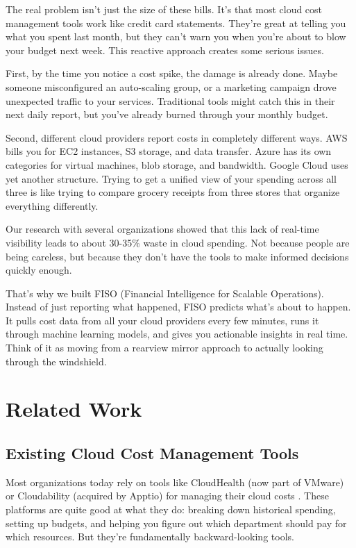 \documentclass[conference]{IEEEtran}
\begin{document}
The real problem isn't just the size of these bills. It's that most cloud cost management tools work like credit card statements. They're great at telling you what you spent last month, but they can't warn you when you're about to blow your budget next week. This reactive approach creates some serious issues.

First, by the time you notice a cost spike, the damage is already done. Maybe someone misconfigured an auto-scaling group, or a marketing campaign drove unexpected traffic to your services. Traditional tools might catch this in their next daily report, but you've already burned through your monthly budget.

Second, different cloud providers report costs in completely different ways. AWS bills you for EC2 instances, S3 storage, and data transfer. Azure has its own categories for virtual machines, blob storage, and bandwidth. Google Cloud uses yet another structure. Trying to get a unified view of your spending across all three is like trying to compare grocery receipts from three stores that organize everything differently.

Our research with several organizations showed that this lack of real-time visibility leads to about 30-35\% waste in cloud spending. Not because people are being careless, but because they don't have the tools to make informed decisions quickly enough.

That's why we built FISO (Financial Intelligence for Scalable Operations). Instead of just reporting what happened, FISO predicts what's about to happen. It pulls cost data from all your cloud providers every few minutes, runs it through machine learning models, and gives you actionable insights in real time. Think of it as moving from a rearview mirror approach to actually looking through the windshield.

\section{Related Work}

\subsection{Existing Cloud Cost Management Tools}

Most organizations today rely on tools like CloudHealth (now part of VMware) or Cloudability (acquired by Apptio) for managing their cloud costs \cite{cloudhealth2020}. These platforms are quite good at what they do: breaking down historical spending, setting up budgets, and helping you figure out which department should pay for which resources. But they're fundamentally backward-looking tools.
\end{document}
